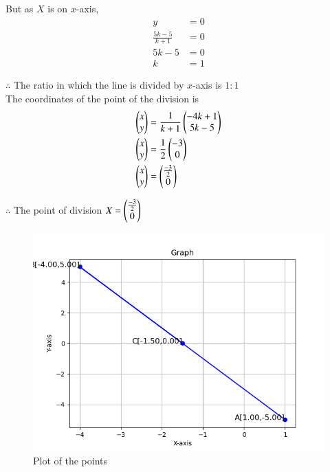 \documentclass[journal]{IEEEtran}
\begin{document}
But as $X$ is on $x$-axis,
\begin{align}
y&=0\\
\frac{5k-5}{k+1}&=0 \label{eq1.1.5.10.6} \\
5k-5&=0 \label{eq1.1.5.10.7} \\
k&=1 \label{eq1.1.5.10.8}
\end{align}

$\therefore$ The ratio in which the line is divided by $x$-axis is $1:1$ \\
The coordinates of the point of the division is \\
\begin{align}
\begin{pmatrix}
x \\
y \\
\end{pmatrix}
&=\frac{1}{k+1}
\begin{pmatrix}
-4k+1 \\
5k-5 \\
\end{pmatrix} \label{eq1.1.5.10.9}
\\
\begin{pmatrix}
x \\
y\\
\end{pmatrix}
&=\frac{1}{2}
\begin{pmatrix}
-3 \\
0 \\
\end{pmatrix} \label{eq1.1.5.10.10}
\\
\begin{pmatrix}
x \\
y \\
\end{pmatrix}
&=
\begin{pmatrix}
\frac{-3}{2} \\
0 \\
\end{pmatrix} \label{eq1.1.5.10.11}
\end{align}

$\therefore$ The point of division $X=\begin{pmatrix}\frac{-3}{2}\\0\\\end{pmatrix}$

\begin{figure}[h!]
\renewcommand{\thefigure}{1}
    \centering
    \includegraphics[width=0.7\linewidth]{figs/plot.png}
    \caption{Plot of the points}
    \label{fig1.1.5.10.1}
\end{figure}
\end{document}
